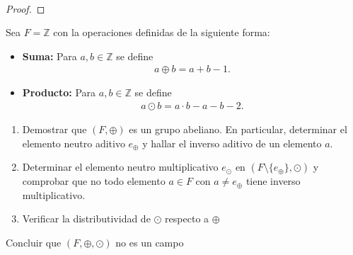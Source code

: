 \documentclass[11pt,letterpaper]{article}
\newcommand{\Z}{\mathbb{Z}}
\begin{document}
\,\\
\begin{proof}
    
\end{proof}

\begin{tcolorbox}[
title=Problema 4, 
width=\linewidth, 
coltitle=B, 
colback=B,
colframe=G, 
fonttitle=\bfseries, 
center title,
]
Sea $F=\Z$ con la operaciones definidas de la siguiente forma:\\
	\begin{itemize}
		\item \textbf{Suma:} Para $a,b\in\Z$ se define
		\begin{align*}
			a\oplus b=a+b-1.
		\end{align*}
		\item \textbf{Producto:} Para $a,b\in\Z$ se define
		\begin{align*}
			a\odot b=a\cdot b-a-b-2.
		\end{align*}
	\end{itemize}

	\begin{enumerate}
		\item Demostrar que $(F,\oplus)$ es un grupo abeliano. En particular, determinar el elemento
		neutro aditivo $e_\oplus$ y hallar el inverso aditivo de un elemento $a$.
		\item Determinar el elemento neutro multiplicativo $e_\odot$ en $(F\setminus\{e_\oplus\},\odot)$ 
		y comprobar que no todo elemento $a\in F$ con $a\neq e_\oplus$ tiene inverso multiplicativo.
		\item Verificar la distributividad de $\odot$ respecto a $\oplus$
	\end{enumerate}
	Concluir que $(F,\oplus, \odot)$ no es un campo 
\end{tcolorbox}
\end{document}
